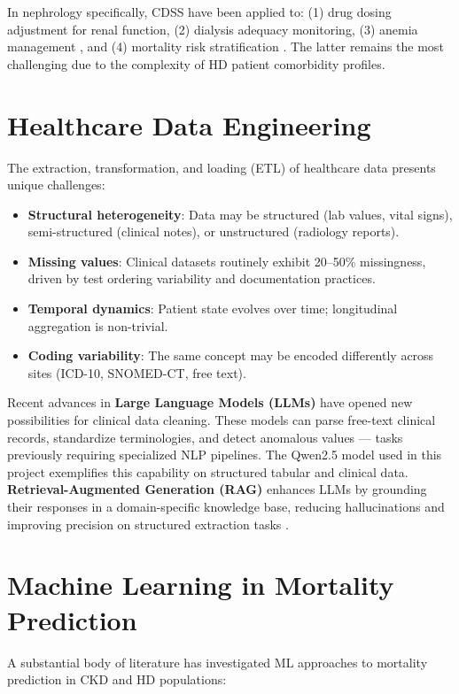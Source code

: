 \documentclass[12pt,a4paper,twoside]{report}
\begin{document}
In nephrology specifically, CDSS have been applied to: (1) drug dosing adjustment for renal function, (2) dialysis adequacy monitoring, (3) anemia management \cite{kdigo_anemia_2012}, and (4) mortality risk stratification \cite{hemodialysis_cdss_2019}. The latter remains the most challenging due to the complexity of HD patient comorbidity profiles.

\section{Healthcare Data Engineering}\label{sec:dateng}

The extraction, transformation, and loading (ETL) of healthcare data presents unique challenges:
\begin{itemize}
  \item \textbf{Structural heterogeneity}: Data may be structured (lab values, vital signs), semi-structured (clinical notes), or unstructured (radiology reports).
  \item \textbf{Missing values}: Clinical datasets routinely exhibit 20--50\% missingness, driven by test ordering variability and documentation practices.
  \item \textbf{Temporal dynamics}: Patient state evolves over time; longitudinal aggregation is non-trivial.
  \item \textbf{Coding variability}: The same concept may be encoded differently across sites (ICD-10, SNOMED-CT, free text).
\end{itemize}

Recent advances in \textbf{Large Language Models (LLMs)} have opened new possibilities for clinical data cleaning. These models can parse free-text clinical records, standardize terminologies, and detect anomalous values — tasks previously requiring specialized NLP pipelines. The Qwen2.5 model \cite{llm_clinical_nlp_2023} used in this project exemplifies this capability on structured tabular and clinical data. \textbf{Retrieval-Augmented Generation (RAG)} enhances LLMs by grounding their responses in a domain-specific knowledge base, reducing hallucinations and improving precision on structured extraction tasks \cite{rag_lewis_2020}.

\section{Machine Learning in Mortality Prediction}\label{sec:mlmort}

A substantial body of literature has investigated ML approaches to mortality prediction in CKD and HD populations:
\end{document}
